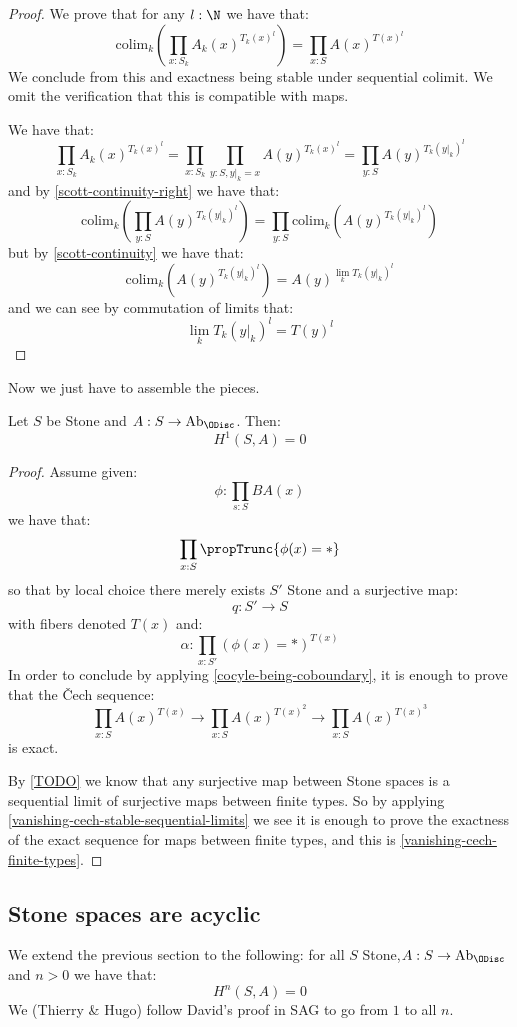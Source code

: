 \begin{proof}
We prove that for any $l:\N$ we have that:
\[\mathrm{colim}_k \left(\prod_{x:S_k}A_k(x)^{T_k(x)^l}\right)  = \prod_{x:S}A(x)^{T(x)^l} \]
We conclude from this and exactness being stable under sequential colimit. We omit the verification that this is compatible with maps. 

We have that:
\[\prod_{x:S_k}A_k(x)^{T_k(x)^l} = \prod_{x:S_k}\prod_{y:S,y|_k=x} A(y)^{T_k(x)^l} = \prod_{y:S} A(y)^{T_k(y|_k)^l}\]
and by \cref{scott-continuity-right} we have that:
\[\mathrm{colim}_k\left(\prod_{y:S} A(y)^{T_k(y|_k)^l}\right) = \prod_{y:S} \mathrm{colim}_k\left( A(y)^{T_k(y|_k)^l} \right)\]
but by \cref{scott-continuity} we have that:
\[\mathrm{colim}_k\left( A(y)^{T_k(y|_k)^l} \right) = A(y)^{\lim_k T_k(y|_k)^l}\]
and we can see by commutation of limits that:
\[\lim_k T_k(y|_k)^l = T(y)^l\]
\end{proof}

Now we just have to assemble the pieces.

\begin{lemma}\label{vanishing-1-cohomology-stone}
Let $S$ be Stone and $A: S\to \mathrm{Ab}_\ODisc$. Then:
\[H^1(S,A) = 0\]
\end{lemma}

\begin{proof}
Assume given:
\[\phi:\prod_{s:S}BA(x)\]
we have that:
\[\prod_{x:S}\propTrunc{\phi(x)=*}\]
so that by local choice there merely exists $S'$ Stone and a surjective map:
\[q:S'\to S\]
with fibers denoted $T(x)$ and:
\[\alpha:\prod_{x:S'}(\phi(x)=*)^{T(x)}\]
In order to conclude by applying \cref{cocyle-being-coboundary}, it is enough to prove that the \v{C}ech sequence:
\[\prod_{x:S}A(x)^{T(x)} \to \prod_{x:S}A(x)^{T(x)^2}  \to \prod_{x:S}A(x)^{T(x)^3} \]
is exact.

By \cref{TODO} we know that any surjective map between Stone spaces is a sequential limit of surjective maps between finite types. So by applying \cref{vanishing-cech-stable-sequential-limits} we see it is enough to prove the exactness of the exact sequence for maps between finite types, and this is \cref{vanishing-cech-finite-types}.
\end{proof}

\subsection{Stone spaces are acyclic}

We extend the previous section to the following: for all $S$ Stone,$A:S\to\mathrm{Ab}_\ODisc$ and $n>0$ we have that:
\[H^n(S,A) = 0\]
We (Thierry \& Hugo) follow David's proof in SAG to go from $1$ to all $n$.

